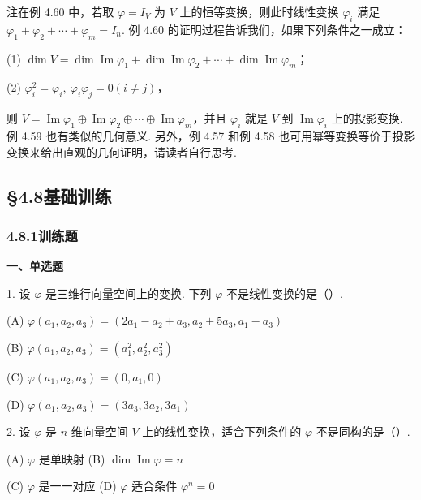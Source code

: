 \documentclass[UTF8,12pt,a4paper,fontset=fandol]{ctexart}
\begin{document}
注\quad 在例 4.60 中，若取 $\varphi=I_V$ 为 $V$ 上的恒等变换，则此时线性变换 $\varphi_i$ 满足 $\varphi_1+\varphi_2+\cdots+\varphi_m=I_n$. 例 4.60 的证明过程告诉我们，如果下列条件之一成立：

(1) $\dim V=\dim\operatorname{Im}\varphi_1+\dim\operatorname{Im}\varphi_2+\cdots+\dim\operatorname{Im}\varphi_m$；

(2) $\varphi_i^2=\varphi_i,\ \varphi_i\varphi_j=0(i\ne j)$，

则 $V=\operatorname{Im}\varphi_1\oplus\operatorname{Im}\varphi_2\oplus\cdots\oplus\operatorname{Im}\varphi_m$，并且 $\varphi_i$ 就是 $V$ 到 $\operatorname{Im}\varphi_i$ 上的投影变换. 例 4.59 也有类似的几何意义. 另外，例 4.57 和例 4.58 也可用幂等变换等价于投影变换来给出直观的几何证明，请读者自行思考.

\subsection*{§4.8\quad 基础训练}

\subsubsection*{4.8.1\quad 训练题}

\noindent\textbf{一、单选题}

1. 设 $\varphi$ 是三维行向量空间上的变换. 下列 $\varphi$ 不是线性变换的是（\quad）.

(A) $\varphi(a_1,a_2,a_3)=(2a_1-a_2+a_3,a_2+5a_3,a_1-a_3)$

(B) $\varphi(a_1,a_2,a_3)=(a_1^2,a_2^2,a_3^2)$

(C) $\varphi(a_1,a_2,a_3)=(0,a_1,0)$

(D) $\varphi(a_1,a_2,a_3)=(3a_3,3a_2,3a_1)$

2. 设 $\varphi$ 是 $n$ 维向量空间 $V$ 上的线性变换，适合下列条件的 $\varphi$ 不是同构的是（\quad）.

(A) $\varphi$ 是单映射 \hfill (B) $\dim\operatorname{Im}\varphi=n$

(C) $\varphi$ 是一一对应 \hfill (D) $\varphi$ 适合条件 $\varphi^n=0$
\end{document}
